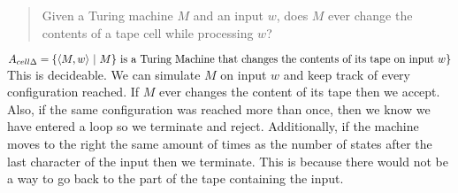 
\begin{quote}
Given a Turing machine $M$ and an input $w$, does $M$ ever change the contents of a tape cell while processing $w$? 	
\end{quote}


\begin{solution}

$A_{cell\Delta} = \{\langle M,w \rangle ~|~ M\} \mbox{ is a Turing Machine that changes the}\\ \mbox{ contents of its tape on input } w   \}$\\
This is decideable. We can simulate $M$ on input $w$ and keep track of every configuration reached. If $M$ ever changes the content of its tape then we accept. Also, if the same configuration was reached more than once, then we know we have entered a loop so we terminate and reject. Additionally, if the machine moves to the right the same amount of times as the number of states after the last character of the input then we terminate. This is because there would not be a way to go back to the part of the tape containing the input.


\end{solution}
